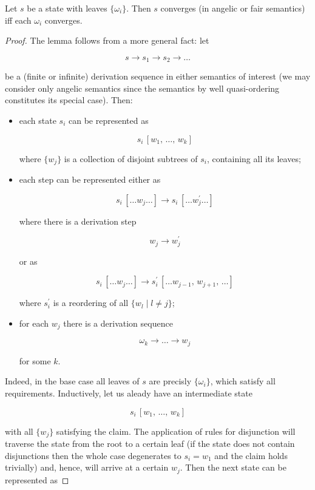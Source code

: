 \begin{lemma}
  \label{lem:convergence-of-leaves}
  Let $s$ be a state with leaves $\{\omega_i\}$. Then $s$ converges (in angelic or fair semantics)
  iff each $\omega_i$ converges.
\end{lemma}
\begin{proof}
  The lemma follows from a more general fact: let

  \[
  s\to s_1\to s_2 \to \dots
  \]

  be a (finite or infinite) derivation sequence in either semantics of interest (we may consider
  only angelic semantics since the semantics by well quasi-ordering constitutes its special case).
  Then:

  \begin{itemize}
    \item each state $s_i$ can be represented as
      
      \[
      s_i\,[w_1,\,\dots,\,w_k]
      \]
      
      where $\{w_j\}$ is a collection of disjoint subtrees of $s_i$, containing all its leaves;
      
    \item each step can be represented either as
      
      \[
      s_i\,[\dots w_j\dots]\to s_i\,[\dots w^\prime_j\dots]
      \]

      where there is a derivation step

      \[
      w_j\to w^\prime_j
      \]

      or as

      \[
      s_i\,[\dots w_j\dots]\to s^\prime_i\,[\dots w_{j-1},\,w_{j+1},\,\dots]
      \]

      where $s^\prime_i$ is a reordering of all $\{w_l\mid l\ne j\}$;
     
    \item for each $w_j$ there is a derivation sequence

      \[
      \omega_k\to\dots\to w_j
      \]

      for some $k$.
  \end{itemize}

  Indeed, in the base case all leaves of $s$ are precisly $\{\omega_i\}$, which satisfy all requirements. Inductively, let
  us aleady have an intermediate state

  \[
  s_i\,[w_1,\,\dots,\,w_k]
  \]

  with all $\{w_j\}$ satisfying the claim. The application of rules for disjunction will traverse the state from the root to
  a certain leaf (if the state does not contain disjunctions then the whole case degenerates to $s_i=w_1$ and the claim
  holds trivially) and, hence, will arrive at a certain $w_j$. Then the next state can be represented as


\end{proof}
